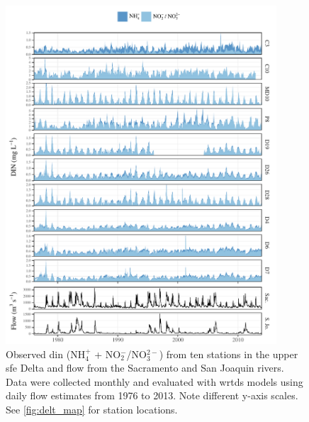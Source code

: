 \documentclass[journal = esthag, manuscript = article]{achemso}\usepackage[]{graphicx}\usepackage[]{color}
\newcommand{\beginsupplement}{%
        \setcounter{table}{0}
        \renewcommand{\thetable}{S\arabic{table}}%
        \setcounter{figure}{0}
        \renewcommand{\thefigure}{S\arabic{figure}}%
     }
\begin{document}
\begin{suppinfo}
\beginsupplement

\begin{figure}[!ht]

{\centering \includegraphics[width=0.9\textwidth]{figs/obsdat-1} 

}

\caption{Observed \ac{din} (NH$_4^{+}$ + NO$_2^{-}$/NO$_3^{2-}$) from ten stations in the upper \ac{sfe} Delta and flow from the Sacramento and San Joaquin rivers.  Data were collected monthly and evaluated with \ac{wrtds} models using daily flow estimates from 1976 to 2013. Note different y-axis scales.  See \cref{fig:delt_map} for station locations.}\label{fig:obsdat}
\end{figure}




\end{suppinfo}
\end{document}
